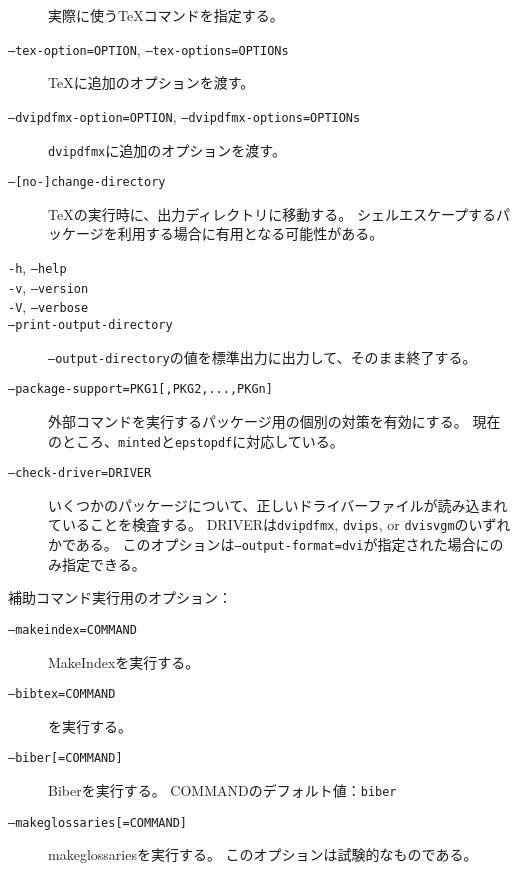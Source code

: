 \documentclass[a4paper]{ltjsreport}
\newcommand\metavar[1]{\textsf{#1}}
\begin{document}
\begin{description}
  実際に使う\TeX{}コマンドを指定する。
\item[\texttt{--tex-option=\metavar{OPTION}}, \texttt{--tex-options=\metavar{OPTIONs}}]
  \TeX{}に追加のオプションを渡す。
\item[\texttt{--dvipdfmx-option=\metavar{OPTION}}, \texttt{--dvipdfmx-options=\metavar{OPTIONs}}]
  \texttt{dvipdfmx}に追加のオプションを渡す。
\item[\texttt{--[no-]change-directory}]
  \TeX{}の実行時に、出力ディレクトリに移動する。
  シェルエスケープするパッケージを利用する場合に有用となる可能性がある。
\item[\texttt{-h}, \texttt{--help}]
\item[\texttt{-v}, \texttt{--version}]
\item[\texttt{-V}, \texttt{--verbose}]
\item[\texttt{--print-output-directory}]
  \texttt{--output-directory}の値を標準出力に出力して、そのまま終了する。
\item[\texttt{--package-support=PKG1[,PKG2,...,PKGn]}]
  外部コマンドを実行するパッケージ用の個別の対策を有効にする。
  現在のところ、\texttt{minted}と\texttt{epstopdf}に対応している。
\item[\texttt{--check-driver=DRIVER}]
  いくつかのパッケージについて、正しいドライバーファイルが読み込まれていることを検査する。
  \metavar{DRIVER}は\texttt{dvipdfmx}, \texttt{dvips}, or \texttt{dvisvgm}のいずれかである。
  このオプションは\texttt{--output-format=dvi}が指定された場合にのみ指定できる。
\end{description}

補助コマンド実行用のオプション：
\begin{description}
\item[\texttt{--makeindex=\metavar{COMMAND}}]
  MakeIndexを実行する。
\item[\texttt{--bibtex=\metavar{COMMAND}}]
  \BibTeX{}を実行する。
\item[\texttt{--biber[=\metavar{COMMAND}]}]
  Biberを実行する。
  \metavar{COMMAND}のデフォルト値：\texttt{biber}
\item[\texttt{--makeglossaries[=\metavar{COMMAND}]}]
  makeglossariesを実行する。
  このオプションは試験的なものである。
\end{description}
\end{document}
